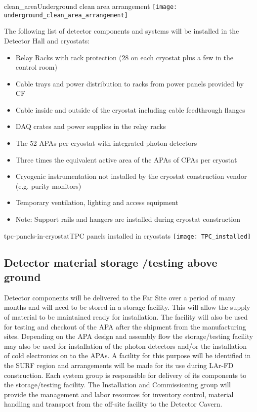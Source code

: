 \begin{cdrfigure}{clean_area}{Underground clean area arrangement}
\texttt{[image: underground\_clean\_area\_arrangement]}
\end{cdrfigure}


The following list of detector components and systems will be installed in the Detector Hall and cryostats: 

\begin{itemize}
\item Relay Racks with rack protection (28 on each cryostat plus a few in the control room) 
\item Cable trays and power distribution to racks from power panels provided by CF 
\item Cable inside and outside of the cryostat including cable feedthrough flanges 
\item DAQ crates and power supplies in the relay racks 
\item The 52 APAs per cryostat with integrated photon detectors 
\item Three times the equivalent active area of the APAs of CPAs per cryostat 
\item Cryogenic instrumentation not installed by the cryostat construction vendor (e.g. purity monitors) 
\item Temporary ventilation, lighting and access equipment 
\item Note: Support rails and hangers are installed during cryostat construction 
\end{itemize}

\begin{cdrfigure}{tpc-panels-in-cryostat}{TPC panels installed in cryostats}
\texttt{[image: TPC\_installed]}
\end{cdrfigure}

\subsection{Detector material storage /testing above ground}
\label{fd:install:fsinstall:mat:storage}

Detector components will be delivered to the Far Site over a period of many months and will need to be stored in a storage facility. This will allow the supply of material to be maintained ready for installation. The facility will 
also be used for testing and checkout of the APA after the shipment from the manufacturing sites. Depending on the APA design and assembly flow the storage/testing facility may also be used for installation of the photon 
detectors and/or the installation of cold electronics on to the APAs.  A facility for this purpose will be identified in the SURF region and arrangements will be made for its use during LAr-FD construction. Each system group is 
responsible for delivery of its components to the storage/testing facility. The Installation and Commissioning group will provide the management and labor resources for inventory control, material handling and transport from the off-site facility to the Detector Cavern. 



